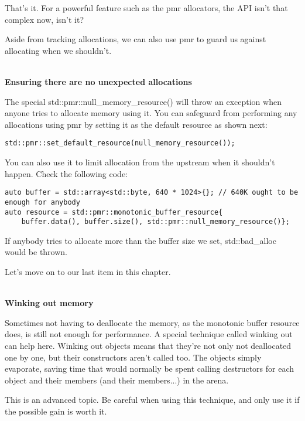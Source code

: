 That's it. For a powerful feature such as the pmr allocators, the API isn't that complex now, isn't it?

Aside from tracking allocations, we can also use pmr to guard us against allocating when we shouldn't.

\hspace*{\fill} \\ %
\noindent
\textbf{Ensuring there are no unexpected allocations}

The special std::pmr::null\_memory\_resource() will throw an exception when anyone tries to allocate memory using it. You can safeguard from performing any allocations using pmr by setting it as the default resource as shown next:

\begin{lstlisting}[style=styleCXX]
std::pmr::set_default_resource(null_memory_resource());
\end{lstlisting}

You can also use it to limit allocation from the upstream when it shouldn't happen. Check the following code:

\begin{lstlisting}[style=styleCXX]
auto buffer = std::array<std::byte, 640 * 1024>{}; // 640K ought to be
enough for anybody
auto resource = std::pmr::monotonic_buffer_resource{
	buffer.data(), buffer.size(), std::pmr::null_memory_resource()};
\end{lstlisting}

If anybody tries to allocate more than the buffer size we set, std::bad\_alloc would be thrown.

Let's move on to our last item in this chapter.

\hspace*{\fill} \\ %
\noindent
\textbf{Winking out memory}

Sometimes not having to deallocate the memory, as the monotonic buffer resource does, is still not enough for performance. A special technique called winking out can help here. Winking out objects means that they're not only not deallocated one by one, but their constructors aren't called too. The objects simply evaporate, saving time that would normally be spent calling destructors for each object and their members (and their members...) in the arena.

\begin{tcolorbox}[colback=blue!5!white,colframe=blue!75!black, title=Note]
\hspace*{0.7cm}This is an advanced topic. Be careful when using this technique, and only use it if the possible gain is worth it.
\end{tcolorbox}

